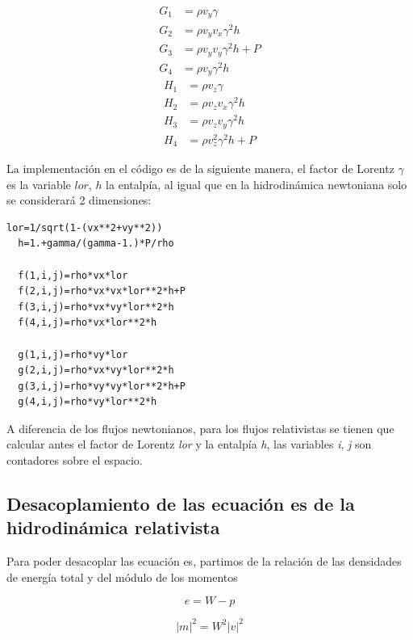 \documentclass[12pt,a4paper]{book}
\providecommand{\abs}[1]{\lvert#1\rvert} %
\begin{document}
\begin{align}
G_{1}& = \rho v_{y} \gamma \\ 
G_{2}& = \rho v_{y} v_{x} \gamma^{2} h \\ 
G_{3}& = \rho v_{y} v_{y} \gamma^{2} h + P\\ 
G_{4}& = \rho v_{y} \gamma^{2} h
\end{align}
\begin{align}
H_{1}& = \rho v_{z} \gamma \\ 
H_{2}& = \rho v_{z} v_{x} \gamma^{2} h \\ 
H_{3}& = \rho v_{z} v_{y} \gamma^{2} h \\ 
H_{4}& = \rho v_{z}^{2} \gamma^{2} h + P
\end{align}

La implementación en el código es de la siguiente manera, el factor de Lorentz $\gamma$ es la variable $lor$, $h$ la entalpía, al igual que en la hidrodinámica newtoniana solo se considerará 2 dimensiones:

\begin{lstlisting}[frame=single]
  lor=1/sqrt(1-(vx**2+vy**2))
  h=1.+gamma/(gamma-1.)*P/rho
  
  f(1,i,j)=rho*vx*lor
  f(2,i,j)=rho*vx*vx*lor**2*h+P
  f(3,i,j)=rho*vx*vy*lor**2*h
  f(4,i,j)=rho*vx*lor**2*h

  g(1,i,j)=rho*vy*lor
  g(2,i,j)=rho*vx*vy*lor**2*h
  g(3,i,j)=rho*vy*vy*lor**2*h+P
  g(4,i,j)=rho*vy*lor**2*h

\end{lstlisting}

A diferencia de los flujos newtonianos, para los flujos relativistas se tienen que calcular antes el factor de Lorentz \emph{lor} y la entalpía \emph{h},
las variables \emph{i}, \emph{j} son contadores sobre el espacio.

\subsection{Desacoplamiento de las ecuación  es de la hidrodinámica relativista} \label{Cap_Desacoplamiento_de_las_ecuación  es_de_la_hidrodinámica_relativista}
Para poder desacoplar las ecuación  es, partimos de la relación de las densidades de energía total y del módulo de los momentos

\begin{equation}\label{ecuación  _de_energia}
  e=W-p
\end{equation}

\begin{equation}\label{modulos de los momentos}
\abs{m}^2= W^{2}\abs{v}^{2}
\end{equation}
\end{document}

